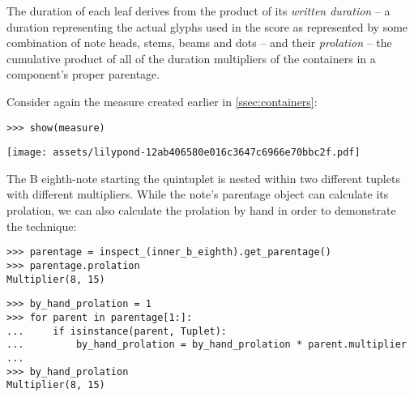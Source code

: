 \noindent The duration of each leaf derives from the product of its
\emph{written duration} -- a duration representing the actual glyphs used in
the score as represented by some combination of note heads, stems, beams and
dots -- and their \emph{prolation} -- the cumulative product of all of the
duration multipliers of the containers in a component's proper parentage.

Consider again the measure created earlier in \autoref{ssec:containers}:

\begin{comment}
<abjad>
show(measure)
</abjad>
\end{comment}

\begin{abjadbookoutput}
\begin{singlespacing}
\vspace{-0.5\baselineskip}
\begin{lstlisting}
>>> show(measure)
\end{lstlisting}
\noindent\texttt{[image: assets/lilypond-12ab406580e016c3647c6966e70bbc2f.pdf]}
\end{singlespacing}
\end{abjadbookoutput}

\noindent The B eighth-note starting the quintuplet is nested within two
different tuplets with different multipliers. While the note's parentage object
can calculate its prolation, we can also calculate the prolation by hand in
order to demonstrate the technique:

\begin{comment}
<abjad>
parentage = inspect_(inner_b_eighth).get_parentage()
parentage.prolation
by_hand_prolation = 1
for parent in parentage[1:]:
    if isinstance(parent, Tuplet):
        by_hand_prolation = by_hand_prolation * parent.multiplier

by_hand_prolation
</abjad>
\end{comment}

\begin{abjadbookoutput}
\begin{singlespacing}
\vspace{-0.5\baselineskip}
\begin{lstlisting}
>>> parentage = inspect_(inner_b_eighth).get_parentage()
>>> parentage.prolation
Multiplier(8, 15)
\end{lstlisting}
\begin{lstlisting}
>>> by_hand_prolation = 1
>>> for parent in parentage[1:]:
...     if isinstance(parent, Tuplet):
...         by_hand_prolation = by_hand_prolation * parent.multiplier
...
>>> by_hand_prolation
Multiplier(8, 15)
\end{lstlisting}
\end{singlespacing}
\end{abjadbookoutput}

